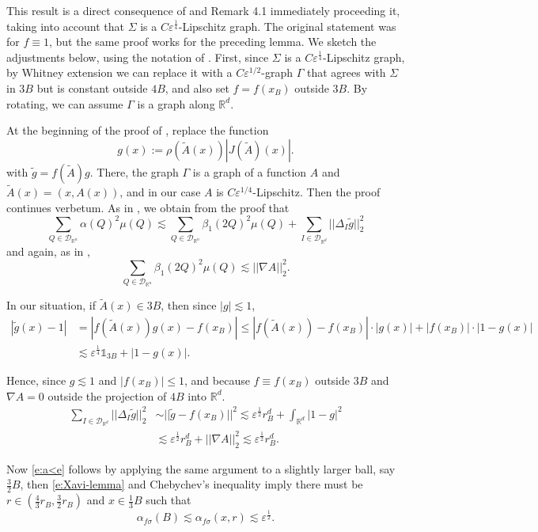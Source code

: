 \documentclass[11pt]{amsart}
\newcommand{\R}{{\mathbb R}}       %
\def\one{\mathds{1}}
\newcommand{\ve}{{\varepsilon}}
\theoremstyle{definition}
\theoremstyle{remark}
\numberwithin{equation}{section}
\def\lec{\lesssim}
\def\grad{\nabla}
\def\lec{\lesssim}
\begin{document}
{%
This result is a direct consequence of \cite[Theorem 1.1]{Tol09} and Remark 4.1 immediately proceeding it, taking into account that
$\Sigma$ is a $C\ve^{\frac14}$-Lipschitz graph. The original statement was for $f\equiv 1$, but the same proof works for the preceding lemma. We sketch the adjustments below, using the notation of \cite{Tol09}. First, since $\Sigma$ is a $C\ve^{\frac{1}{4}}$-Lipschitz graph, by Whitney extension we can replace it with a $C\ve^{1/2}$-graph $\Gamma$ that agrees with $\Sigma$ in $3B$ but is constant outside $4B$, and also set $f=f(x_{B})$ outside $3B$. By rotating, we can assume $\Gamma$ is a graph along $\R^{d}$.

At the beginning of the proof of \cite[Theorem 1.1]{Tol09}, replace the function
\[
g(x) := \rho(\tilde{A}(x)) |J(\tilde{A})(x)|.
\]
with $\tilde{g} = f(\tilde{A})g$. There, the graph $\Gamma$ is a graph of a function $A$ and $\tilde{A}(x)=(x,A(x))$, and in our case $A$ is $C\ve^{1/4}$-Lipschitz. Then the proof continues verbetum. As in \cite[Remark 4.1]{Tol09}, we obtain from the proof that 
\[
\sum_{Q\in \mathcal{D}_{\R^{n}}} \alpha(Q)^{2}\mu(Q)
\lec \sum_{Q\in \mathcal{D}_{\R^{n}}} \beta_{1}(2Q)^{2}\mu(Q) + \sum_{I\in \mathcal{D}_{\R^{d}}} ||\Delta_{I} \tilde{g}||_{2}^{2}
\]
and  again, as in \cite[Remark 4.1]{Tol09}, 
\[
 \sum_{Q\in \mathcal{D}_{\R^{n}}} \beta_{1}(2Q)^{2}\mu(Q) \lec ||\grad A||_{2}^{2}.
 \]
 
In our situation, if $\tilde{A}(x)\in 3B$, then since $|g|\lec 1$,
\begin{align*}
|\tilde{g}(x)-1|
& =|f(\tilde{A}(x))g(x) -f(x_{B})|
\leq |f(\tilde{A}(x))-f(x_{B})|\cdot |g(x)| + |f(x_{B})|\cdot |1-g(x)|
\\
& \lec \ve^{\frac{1}{4}}\one_{3B} +|1-g(x)|.
\end{align*}

Hence, since $g\lec 1$ and $|f(x_{B})|\leq  1$, and because $f\equiv f(x_{B})$ outside $3B$ and $\grad A=0$ outside the projection of $4B$ into $\R^{d}$. 
\begin{align*}
\sum_{I\in \mathcal{D}_{\R^{d}}} ||\Delta_{I} \tilde{g}||_{2}^{2}
& \sim ||\tilde{g}-f(x_{B})||^{2} \lec \ve^{\frac{1}{2}} r_{B}^{d} + \int_{\R^{d}} |1-g|^{2}\\
& \lec \ve^{\frac{1}{2}} r_{B}^{d} + ||\grad A||_{2}^{2}
\lec \ve^{\frac{1}{2}}r_{B}^{d}. 
\end{align*}

Now \eqref{e:a<e} follows by applying the same argument to a slightly larger ball, say $\frac{3}{2}B$, then \eqref{e:Xavi-lemma} and Chebychev's inequality imply there must be $r\in (\frac{4}{3}r_{B},\frac{3}{2}r_{B})$ and $x\in \frac{1}{3}B$ such that 
\[
\alpha_{f\sigma}(B)
\lec \alpha_{f\sigma}(x,r) \lec \ve^{\frac{1}{2}}. 
\]


}
\end{document}
